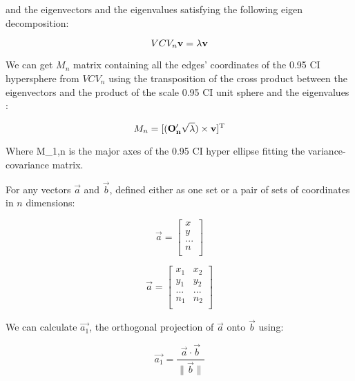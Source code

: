 \documentclass[a4paper,11pt]{article}
\begin{document}
\begin{center}
and the eigenvectors  and the eigenvalues \lambda satisfying the following eigen decomposition:

\begin{equation}
    VCV_{n}\bold{v} = \lambda \bold{v}
\end{equation}

We can get $M_{n}$ matrix containing all the edges' coordinates of the 0.95 CI hypersphere from $VCV_{n}$ using the transposition of the cross product between the eigenvectors  and the product of the scale 0.95 CI unit sphere  and the eigenvalues \lambda:

\begin{equation}
    M_{n} = [(\bold{O'_{n}}\sqrt{\lambda}) \times \bold{v}]^{\text{T}}
\end{equation}

Where M_{1,n} is the major axes of the 0.95 CI hyper ellipse fitting the variance-covariance matrix.

\end{center}

For any vectors $\vec{a}$ and $\vec{b}$, defined either as one set or a pair of sets of coordinates in $n$ dimensions:

\begin{equation}
    \vec{a} = 
    \begin{bmatrix}
    x \\
    y \\
    ... \\
    n \\
    \end{bmatrix}
\end{equation}

\begin{equation}
    \vec{a} = 
    \begin{bmatrix}
    x_{1} & x_{2} \\
    y_{1} & y_{2} \\
    ... & ... \\
    n_{1} & n_{2} \\
    \end{bmatrix}
\end{equation}

We can calculate $\vec{a_{1}}$, the orthogonal projection of $\vec{a}$ onto $\vec{b}$ using:

\begin{equation}
    \vec{a_{1}} = \frac{\vec{a} \cdot \vec{b}}{\|\vec{b}\|}
\end{equation}
\end{document}
